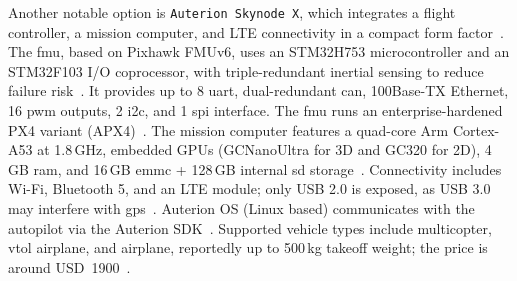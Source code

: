 Another notable option is \lstinline|Auterion Skynode X|, which integrates a
flight controller, a mission computer, and LTE connectivity in a compact form
factor~\cite{skynodeXWebsite}.
The \gls{fmu}, based on Pixhawk FMUv6, uses an STM32H753 microcontroller and an STM32F103 I/O coprocessor, with triple-redundant inertial sensing to reduce failure risk~\cite{skynodeXDatasheet}. 
It provides up to 8 \gls{uart}, dual-redundant \gls{can}, 100Base-TX Ethernet, 16 \gls{pwm} outputs, 2 \gls{i2c}, and 1 \gls{spi} interface. 
The \gls{fmu} runs an enterprise-hardened PX4 variant (APX4)~\cite{skynodeXDatasheet}. 
The mission computer features a quad-core Arm Cortex-A53 at 1.8\,GHz, embedded GPUs (GCNanoUltra for 3D and GC320 for 2D), 4\,GB \gls{ram}, and 16\,GB \gls{emmc} + 128\,GB internal \gls{sd} storage~\cite{skynodeXDatasheet}. 
Connectivity includes Wi-Fi, Bluetooth 5, and an LTE module; only USB 2.0 is exposed, as USB 3.0 may interfere with \gls{gps}~\cite{skynodeXDatasheet}. 
Auterion OS (Linux based) communicates with the autopilot via the Auterion SDK~\cite{skynodeX-px4}. 
Supported vehicle types include multicopter, \gls{vtol} airplane, and airplane, reportedly up to 500\,kg takeoff weight; the price is around USD~1900~\cite{skynodePrice}.


